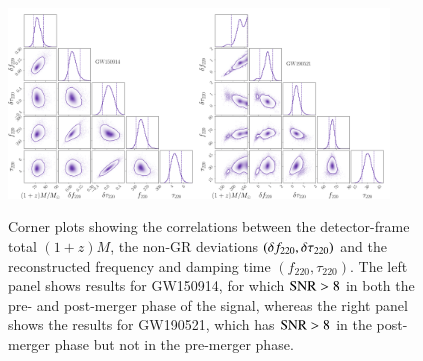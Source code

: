 \begin{figure}
\begin{center}
        \includegraphics[width=0.45\textwidth]{figures/mtotal_qnm_params_degeneracy_GW150914.pdf}\includegraphics[width=0.45\textwidth]{figures/mtotal_qnm_params_degeneracy_S190521g.pdf}
        \caption{Corner plots showing the correlations between the detector-frame total $(1+z)M$, the non-GR deviations $(\delta f_{\text{220}}, \delta \tau_{\text{220}})$ and the reconstructed frequency and damping time $(f_{220},\tau _{220})$. The left panel shows results for GW150914, for which ${\rm SNR}> 8$ in both the pre- and
post-merger phase of the signal, whereas the right panel shows the results for GW190521,  which has ${\rm SNR}> 8$ in the post-merger phase but not in the pre-merger phase.}
        \label{fig:correlations}
\end{center}
\end{figure}
